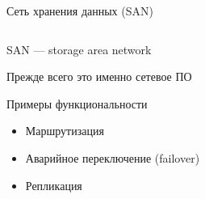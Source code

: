 \documentclass[aspectratio=169]{beamer}
\begin{document}
\begin{frame}{Сеть хранения данных (SAN)}
\begin{columns}
    \begin{column}{.3\textwidth}
        SAN --- storage area network
        
        \vspace{1em}
        Прежде всего это именно сетевое ПО

        \vspace{1em}
        Примеры функциональности
        \begin{itemize}
            \item Маршрутизация
            \item Аварийное переключение (failover)
            \item Репликация
        \end{itemize}
    \end{column}
    \hfill
    \begin{column}{.66\textwidth}
        \san
    \end{column}
\end{columns}
\end{frame}
\end{document}

